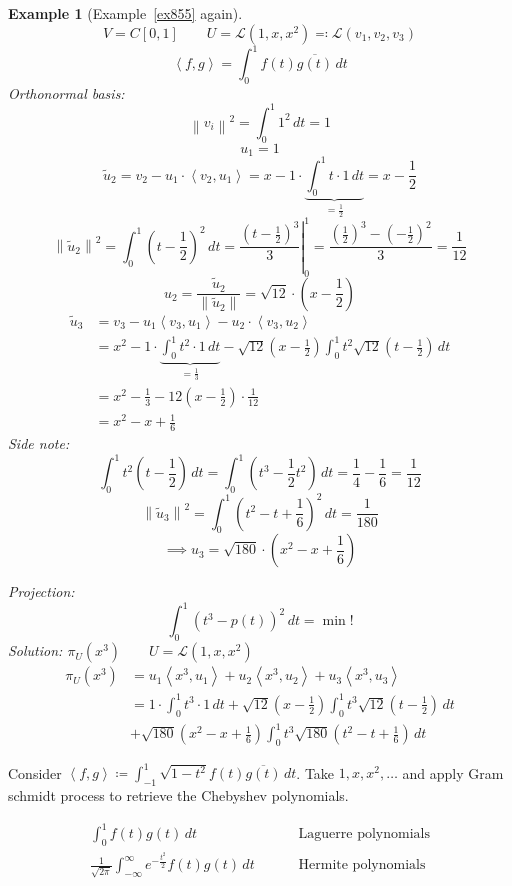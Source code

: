 \documentclass{article}
\newcounter{lecref}[section]
\numberwithin{lecref}{section}
\newtheorem{example}[lecref]{Example}
\newcommand{\ip}[2]{\left\langle#1,#2\right\rangle} %
\newcommand{\norm}[1]{\left\|#1\right\|}
\begin{document}
\begin{example}[Example~\ref{ex855} again] %
  \[ V = C[0,1] \qquad U = \mathcal L(1, x, x^2) \eqqcolon \mathcal L(v_1, v_2, v_3) \]
  \[ \ip fg = \int_0^1 f(t) \overline{g(t)} \, dt \]
  Orthonormal basis:
  \[ \norm{v_i}^2 = \int_0^1 1^2 \, dt = 1 \]
  \[ u_1 = 1 \]
  \[ \tilde u_2 = v_2 - u_1 \cdot \ip{v_2}{u_1} = x - 1 \cdot \underbrace{\int_0^1 t \cdot 1 \, dt}_{= \frac12} = x - \frac12 \]
  \[ \norm{\tilde u_2}^2 = \int_0^1 (t - \frac12)^2 \, dt = \left.\frac{(t - \frac12)^3}{3} \right|_0^1 = \frac{(\frac12)^3 - (-\frac12)^2}{3} = \frac1{12} \]
  \[ u_2 = \frac{\tilde u_2}{\norm{\tilde u_2}} = \sqrt{12} \cdot (x - \frac12) \]
  \begin{align*}
    \tilde u_3 &= v_3 - u_1 \ip{v_3}{u_1} - u_2 \cdot \ip{v_3}{u_2} \\
      &= x^2 - 1 \cdot \underbrace{\int_0^1 t^2 \cdot 1 \, dt}_{= \frac13} - \sqrt{12} (x - \frac12) \int_0^1 t^2 \sqrt{12} (t - \frac12) \, dt \\
      &= x^2 - \frac13 - 12 (x - \frac12) \cdot \frac1{12} \\
      &= x^2 - x + \frac16
  \end{align*}
  Side note:
  \[ \int_0^1 t^2 (t - \frac12) \, dt = \int_0^1 (t^3 - \frac12 t^2) \, dt = \frac14 - \frac16 = \frac1{12} \]
  \[ \norm{\tilde u_3}^2 = \int_0^1 (t^2 - t + \frac16)^2 \, dt = \frac1{180} \]
  \[ \implies u_3 = \sqrt{180} \cdot (x^2 - x + \frac16) \]

  Projection:
  \[ \int_0^1 (t^3 - p(t))^2 \, dt = \operatorname{min}! \]
  Solution: $\pi_U(x^3) \qquad U = \mathcal L(1, x, x^2)$
  \begin{align*}
    \pi_U(x^3) &= u_1 \ip{x^3}{u_1} + u_2 \ip{x^3}{u_2} + u_3 \ip{x^3}{u_3} \\
      &= 1 \cdot \int_0^1  t^3 \cdot 1 \, dt + \sqrt{12} \left(x - \frac12\right) \int_0^1 t^3 \sqrt{12} \left(t - \frac12\right) \, dt \\
      &+ \sqrt{180} \left(x^2 - x + \frac16\right) \int_0^1 t^3 \sqrt{180} \left(t^2 - t + \frac16\right) \, dt
  \end{align*}
\end{example}

Consider $\ip fg \coloneqq \int_{-1}^1 \sqrt{1 - t^2} f(t) \overline{g(t)} \, dt$.
Take $1, x, x^2, \ldots$ and apply Gram schmidt process to retrieve the Chebyshev polynomials.

\begin{align*}
  \int_0^1 f(t) g(t) \, dt &\qquad \text{ Laguerre polynomials} \\
  \frac1{\sqrt{2\pi}} \int_{-\infty}^\infty e^{-\frac{t^2}{2}}  f(t) g(t) \, dt &\qquad \text{ Hermite polynomials}
\end{align*}
\end{document}
